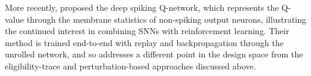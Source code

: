 More recently, \citep{Chen2022SpikingQLearning} proposed the
deep spiking Q-network, which represents the Q-value through the membrane
statistics of non-spiking output neurons, illustrating the continued
interest in combining SNNs with reinforcement learning. Their method is
trained end-to-end with replay and backpropagation through the unrolled
network, and so addresses a different 
point in the design space from the eligibility-trace
and perturbation-based approaches discussed above.